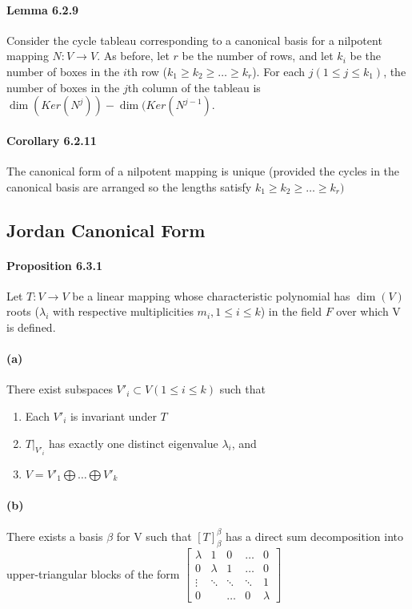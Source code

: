 \documentclass[11pt]{article}
\begin{document}
{\paragraph{Lemma 6.2.9} Consider the cycle tableau corresponding to a canonical basis for a nilpotent mapping $N: V \rightarrow V$. As before, let $r$ be the number of rows, and let $k_i$ be the number of boxes in the $i$th row ($k_1\geq k_2 \geq \hdots \geq k_r$). For each $j ( 1\leq j \leq k_1)$, the number of boxes in the $j$th column of the tableau is $\dim(Ker(N^j)) - \dim(Ker(N^{j-1})$. 
\paragraph{Corollary 6.2.11} The canonical form of a nilpotent mapping is unique (provided the cycles in the canonical basis are arranged so the lengths satisfy $k_1 \geq k_2 \geq \hdots \geq k_r)$
\subsection{Jordan Canonical Form}

\paragraph{Proposition 6.3.1} Let $T: V \rightarrow V$ be a linear mapping whose characteristic polynomial has $\dim(V)$ roots ($\lambda_i$ with respective multiplicities $m_i, 1 \leq i\leq k$) in the field $F$ over which V is defined.
\paragraph{(a)}There exist subspaces $V'_i\subset V (1\leq i \leq k)$ such that
\begin{enumerate}
	\item Each $V'_i$ is invariant under $T$
	\item $T|_{V'_i}$ has exactly one distinct eigenvalue $\lambda_i$, and
	\item $V = V'_1 \bigoplus \hdots \bigoplus V'_k$
\end{enumerate}
\paragraph{(b)} There exists a basis $\beta$ for V such that $[T]_\beta^\beta$ has a direct sum decomposition into upper-triangular blocks of the form 	$\begin{bmatrix}
		\lambda &1&0&\hdots&0\\
		0&\lambda&1&\hdots&0\\
		\vdots & \ddots&\ddots&\ddots&1\\
		0&&\hdots&0&\lambda
	\end{bmatrix}$
}
\end{document}
